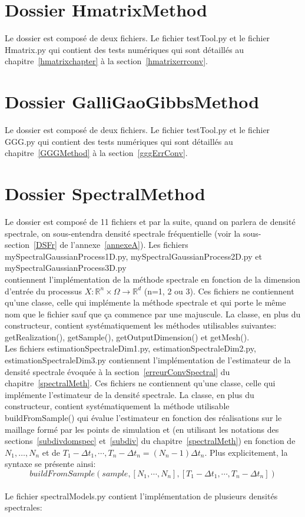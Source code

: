 \section{Dossier HmatrixMethod}
Le dossier est composé de deux fichiers. Le fichier testTool.py et
le fichier Hmatrix.py qui contient des tests numériques qui sont détaillés
au chapitre~\ref{hmatrixchapter} à la section~\ref{hmatrixerrconv}.

\section{Dossier GalliGaoGibbsMethod}
Le dossier est composé de deux fichiers. Le fichier testTool.py et
le fichier GGG.py qui contient des tests numériques qui sont détaillés
au chapitre~\ref{GGGMethod} à la section~\ref{gggErrConv}.

\section{Dossier SpectralMethod}
\label{dossSpec}
Le dossier est composé de 11 fichiers et par la suite, quand on parlera de densité spectrale, on
sous-entendra densité spectrale fréquentielle (voir la sous-section~\ref{DSFr} de l'annexe~\ref{annexeA}). Les fichiers
mySpectralGaussianProcess1D.py, mySpectralGaussianProcess2D.py et mySpectralGaussianProcess3D.py\\
contiennent l'implémentation de la méthode spectrale en fonction de la dimension d'entrée
du processus $X: \mathbb{R}^n \times \Omega \rightarrow \mathbb{R}^d$ (n=1, 2 ou 3). Ces
fichiers ne contiennent qu'une classe, celle qui implémente la méthode spectrale et
qui porte le même nom que le fichier sauf que ça commence par une majuscule. La classe, en plus
du constructeur, contient systématiquement les méthodes utilisables suivantes: getRealization(),
getSample(), getOutputDimension() et getMesh().\\

Les fichiers estimationSpectraleDim1.py, estimationSpectraleDim2.py, estimationSpectraleDim3.py contiennent
l'implémentation de l'estimateur de la densité spectrale évoquée à la section~\ref{erreurConvSpectral}
du chapitre~\ref{spectralMeth}. Ces fichiers ne contiennent qu'une classe, celle qui implémente l'estimateur
de la densité spectrale. La classe, en plus du constructeur, contient systématiquement la méthode utilisable
buildFromSample() qui évalue l'estimateur en fonction des réalisations sur le maillage formé par les points de simulation
et (en utilisant les notations des sections~\ref{subdivdomspec} et~\ref{subdiv} du chapitre~\ref{spectralMeth}) en
fonction de $N_1, \dots, N_n$ et de $T_1 - \Delta t_1 , \cdots, T_n - \Delta t_n  = (N_n- 1)\Delta t_n$. Plus explicitement,
la syntaxe se présente ainsi:
\begin{equation*} buildFromSample(sample, [N_1, \cdots, N_n], [T_1 - \Delta t_1 , \cdots, T_n - \Delta t_n]) \end{equation*}
~\\
Le fichier spectralModels.py contient l'implémentation de plusieurs densités spectrales:

